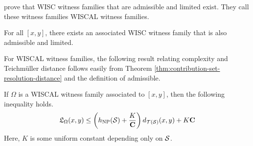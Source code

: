\documentclass[12pt, reqno]{amsart}
\begin{document}
\textcite{dowdall2023lattice} prove that WISC witness families that are admissible and limited exist. They call these witness families WISCAL witness families.

\begin{proposition}
  For all $[x,y]$, there exists an associated WISC witness family that is also admissible and limited.
\end{proposition}

For WISCAL witness families, the following result relating complexity and Teichmüller distance follows easily from Theorem \ref{thm:contribution-set-resolution-distance} and the definition of admissible.

\begin{proposition}
  \label{prop:complexity-length-inequality}
  If $\Omega$ is a WISCAL witness family associated to $[x,y]$, then the following inequality holds.
  \begin{align*}
    \mathfrak{L}_{\Omega}(x,y) \leq \left( h_{\mathrm{NP}}(\mathcal{S}) + \frac{K}{\mathbf{C}} \right) d_{\mathcal{T}(\mathcal{S})}(x, y) + K \mathbf{C}
  \end{align*}
  Here, $K$ is some uniform constant depending only on $\mathcal{S}$.
\end{proposition}



\end{document}

